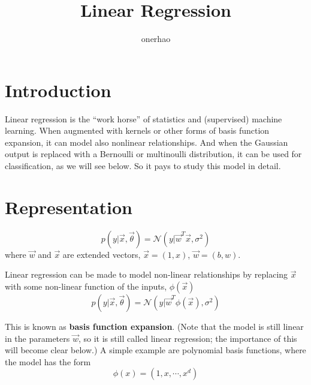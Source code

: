 \documentclass[]{article}
\title{Linear Regression}
\author{onerhao}
\begin{document}
\maketitle

\begin{abstract}

\end{abstract}


\section{Introduction}
Linear regression is the “work horse” of statistics and (supervised) machine learning. When augmented with kernels or other forms of basis function expansion, it can model also nonlinear relationships. And when the Gaussian output is replaced with a Bernoulli or multinoulli distribution, it can be used for classification, as we will see below. So it pays to study this model in detail.


\section{Representation}

\begin{equation}
p(y|\vec{x},\vec{\theta})=\mathcal{N}(y|\vec{w}^T\vec{x}, \sigma^2)
\end{equation}
where $\vec{w}$ and $\vec{x}$ are extended vectors, $\vec{x}=(1,x)$, $\vec{w}=(b,w)$.

Linear regression can be made to model non-linear relationships by replacing $\vec{x}$ with some non-linear function of the inputs, $\phi(\vec{x})$ \begin{equation}
p(y|\vec{x},\vec{\theta})=\mathcal{N}(y|\vec{w}^T\phi(\vec{x}), \sigma^2)
\end{equation}

This is known as \textbf{basis function expansion}. (Note that the model is still linear in the parameters $\vec{w}$, so it is still called linear regression; the importance of this will become clear below.) A simple example are polynomial basis functions, where the model has the form
\begin{equation}
\phi(x)=(1, x, \cdots, x^d)
\end{equation}
\end{document}
